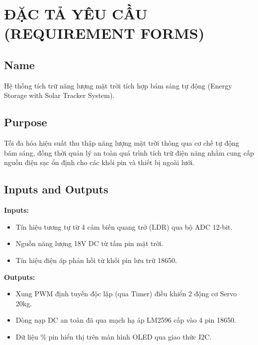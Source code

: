 \documentclass[12pt,a4paper]{report}
\begin{document}
\setcounter{page}{1}
\tableofcontents
\clearpage

\chapter{ĐẶC TẢ YÊU CẦU (REQUIREMENT FORMS)}

\section{Name}

Hệ thống tích trữ năng lượng mặt trời tích hợp bám sáng tự động (Energy Storage with Solar Tracker System).

\section{Purpose}

Tối đa hóa hiệu suất thu thập năng lượng mặt trời thông qua cơ chế tự động bám sáng, đồng thời quản lý an toàn quá trình tích trữ điện năng nhằm cung cấp nguồn điện sạc ổn định cho các khối pin và thiết bị ngoài lưới.

\section{Inputs and Outputs}

\textbf{Inputs:}
\begin{itemize}[leftmargin=1.5em,itemsep=3pt]
  \item Tín hiệu tương tự từ 4 cảm biến quang trở (LDR) qua bộ ADC 12-bit.
  \item Nguồn năng lượng 18V DC từ tấm pin mặt trời.
  \item Tín hiệu điện áp phản hồi từ khối pin lưu trữ 18650.
\end{itemize}

\textbf{Outputs:}
\begin{itemize}[leftmargin=1.5em,itemsep=3pt]
  \item Xung PWM định tuyến độc lập (qua Timer) điều khiển 2 động cơ Servo 20kg.
  \item Dòng nạp DC an toàn đã qua mạch hạ áp LM2596 cấp vào 4 pin 18650.
  \item Dữ liệu \% pin hiển thị trên màn hình OLED qua giao thức I2C.
\end{itemize}
\end{document}
